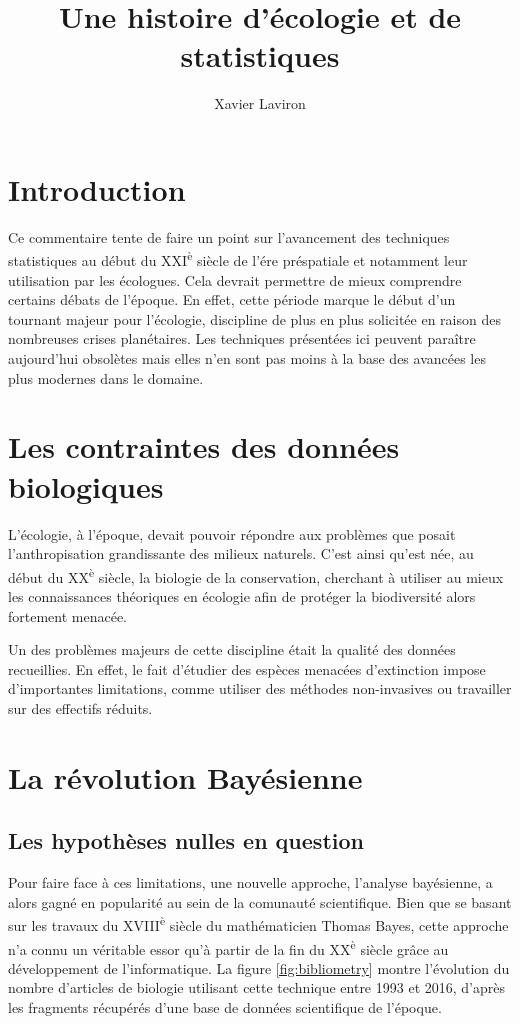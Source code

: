 \documentclass[11pt,twocolumn,twoside]{bopHomework}
\title{Une histoire d'écologie et de statistiques}
\author[1,*]{Xavier Laviron}
\affil[1]{Département des publications (BOP2), Société de publication de
  l'Encyclopedia Galactica, Presses de Terminus}
\affil[*]{Contact : xavier.laviron@gmx.fr}
\begin{document}
\maketitle

\section{Introduction}

Ce commentaire tente de faire un point sur l'avancement des techniques
statistiques au début du XXI\textsuperscript{è} siècle de l'ére préspatiale et
notamment leur utilisation par les écologues.
Cela devrait permettre de mieux comprendre certains débats de l'époque.
En effet, cette période marque le début d'un tournant majeur pour l'écologie,
discipline de plus en plus solicitée en raison des nombreuses crises
planétaires.
Les techniques présentées ici peuvent paraître aujourd'hui obsolètes mais elles
n'en sont pas moins à la base des avancées les plus modernes dans le domaine.


\section{Les contraintes des données biologiques}

L'écologie, à l'époque, devait pouvoir répondre aux problèmes que posait
l'anthropisation grandissante des milieux naturels.
C'est ainsi qu'est née, au début du XX\textsuperscript{è} siècle, la biologie de
la conservation, cherchant à utiliser au mieux les connaissances théoriques en
écologie afin de protéger la biodiversité alors fortement menacée.

Un des problèmes majeurs de cette discipline était la qualité des données
recueillies.
En effet, le fait d'étudier des espèces menacées d'extinction impose
d'importantes limitations, comme utiliser des méthodes non-invasives ou
travailler sur des effectifs réduits.


\section{La révolution Bayésienne}
\subsection{Les hypothèses nulles en question}

Pour faire face à ces limitations, une nouvelle approche, l'analyse bayésienne,
a alors gagné en popularité au sein de la comunauté scientifique.
Bien que se basant sur les travaux du XVIII\textsuperscript{è} siècle du
mathématicien Thomas Bayes, cette approche n'a connu un véritable essor qu'à
partir de la fin du XX\textsuperscript{è} siècle grâce au développement de
l'informatique.
La figure \ref{fig:bibliometry} montre l'évolution du nombre d'articles de
biologie utilisant cette technique entre 1993 et 2016, d'après les fragments
récupérés d'une base de données scientifique de l'époque.
\end{document}
